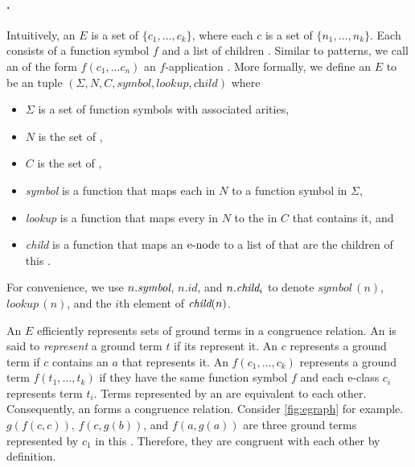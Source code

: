 \paragraph{\Egraph.}
Intuitively, an \egraph $E$ is a set of \eclasses $\{c_1, \ldots, c_k\}$, where each \eclass $c$ is a set of \enodes $\{n_1,\ldots,n_k\}$. Each \enode consists of a function symbol $f$ and a list of children \eclasses. 
Similar to patterns, we call an \enode of the form $f(c_1, \ldots c_n)$ an $f$-application \enode.
More formally, we define an \egraph $E$ to be an tuple $(\Sigma,N,C,\textit{symbol}, \textit{lookup}, \textit{child})$ where 
\begin{itemize}
    \item $\Sigma$ is a set of function symbols with associated arities,
    \item $N$ is the set of \enodes,
    \item $C$ is the set of \eclasses,
    \item \textit{symbol} is a function that maps each \enode in $N$ to a function symbol in $\Sigma$,
    \item \textit{lookup} is a function that maps every \enode in $N$ to the \eclass in $C$ that contains it, and
    \item \textit{child} is a function that maps an $\mbox{e-node}$ to a list of \eclass that are the children of this \enode.
\end{itemize}
For convenience, we use $n.\textit{symbol}$, $n.\textit{id}$, and $n.\textit{child}_i$ to denote $\textit{symbol}\,(n)$, $\textit{lookup}\,(n)$, and the $i$th element of $\textit{child}(n)$.

An \egraph $E$ efficiently represents sets of ground terms in a congruence relation. 
An \egraph is said to \textit{represent} a ground term $t$ if its \eclasses represent it.
An \eclass $c$ represents a ground term if $c$ contains an \enode $a$ that represents it. 
An \enode $f(c_1,\dots,c_k)$ represents a ground term $f(t_1,\dots,t_k)$ if they have the same function symbol $f$ and each e-class $c_i$ represents term $t_i$.
Terms represented by an \eclass are equivalent to each other.
Consequently, an \egraph forms a congruence relation.
Consider \autoref{fig:egraph} for example. $g(f(c,c))$, $f(c, g(b))$, and $f(a, g(a))$ are three ground terms represented by \eclass $c_1$ in this \egraph. Therefore, they are congruent with each other by definition.

